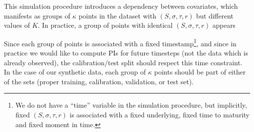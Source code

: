 \documentclass{article}
\theoremstyle{definition}
\begin{document}
This simulation procedure introduces a dependency between covariates, which manifests as groups of $\kappa$ points in the dataset with $(S, \sigma, \tau, r)$ but different values of $K$. %
In practice, a group of points with identical $(S, \sigma, \tau, r)$ appears 

Since each group of points is associated with a fixed timestamp\footnote{We do not have a ``time'' variable in the simulation procedure, but implicitly, fixed $(S, \sigma, \tau, r)$ is associated with a fixed underlying, fixed time to maturity and fixed moment in time.}, and since in practice we would like to compute PIs for future timesteps (not the data which is already observed), the calibration/test split should respect this time constraint. In the case of our synthetic data, each group of $\kappa$ points should be part of either of the sets (proper training, calibration, validation, or test set).
\end{document}
